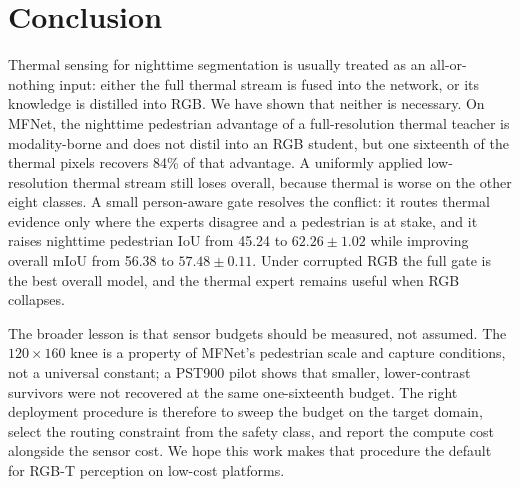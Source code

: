 \section{Conclusion}

Thermal sensing for nighttime segmentation is usually treated as an all-or-nothing
input: either the full thermal stream is fused into the network, or its knowledge is
distilled into RGB. We have shown that neither is necessary. On MFNet, the nighttime
pedestrian advantage of a full-resolution thermal teacher is modality-borne and does
not distil into an RGB student, but one sixteenth of the thermal pixels recovers 84\%
of that advantage. A uniformly applied low-resolution thermal stream still loses overall, because
thermal is worse on the other eight classes. A small person-aware gate resolves the
conflict: it routes thermal evidence only where the experts disagree and a pedestrian
is at stake, and it raises nighttime pedestrian IoU from 45.24 to $62.26\pm1.02$ while
improving overall mIoU from 56.38 to $57.48\pm0.11$. Under corrupted RGB the full gate
is the best overall model, and the thermal expert remains useful when RGB collapses.

The broader lesson is that sensor budgets should be measured, not assumed. The
$120\times160$ knee is a property of MFNet's pedestrian scale and capture conditions,
not a universal constant; a PST900 pilot shows that smaller, lower-contrast survivors
were not recovered at the same one-sixteenth budget. The right deployment procedure is therefore to sweep the
budget on the target domain, select the routing constraint from the safety class, and
report the compute cost alongside the sensor cost. We hope this work makes that
procedure the default for RGB-T perception on low-cost platforms.
